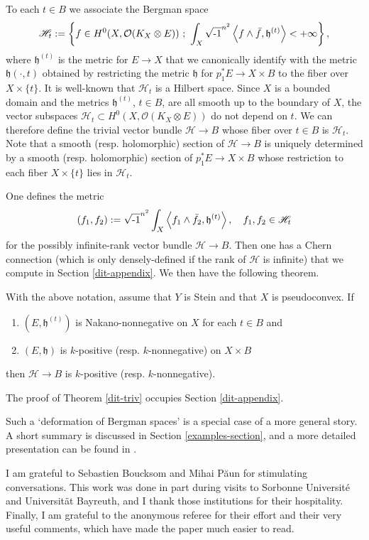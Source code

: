 \documentclass[12pt,hidelinks]{amsart}
\newcommand{\noi}{\noindent}
\newcommand{\cO}{{\mathcal O}}
\newcommand{\sH}{{\mathscr H}}
\newcommand{\fh}{{\mathfrak h}}
\newcommand{\ii}{\sqrt{\text{\rm -}1}}
\newcommand{\tensor}{\otimes}
\begin{document}
To each $t\in B$ we associate the Bergman space 
\[
\sH _t := \left \{ f \in H^0(X, \cO (K_X \tensor E))\ ;\ \int _X \ii ^{n^2}\left< f \wedge \bar f , \fh^{(t)} \right > < +\infty \right \},
\]
where $\fh ^{(t)}$ is the metric for $E \to X$ that we canonically identify with the metric $\fh (\cdot, t)$ obtained by restricting the metric $\fh$ for $p_1^*E \to X \times B$ to the fiber over $X \times \{t\}$.  It is well-known that $\sH_t$ is a Hilbert space.  Since $X$ is a bounded domain and the metrics $\fh^{(t)}$, $t \in B$, are all smooth up to the boundary of $X$, the vector subspaces $\sH _t \subset H^0(X, \cO (K_X \tensor E))$ do not depend on $t$.  We can therefore define the trivial vector bundle $\sH \to B$ whose fiber over $t \in B$ is $\sH _t$.  Note that a smooth (resp. holomorphic) section of $\sH \to B$ is uniquely determined by a smooth (resp. holomorphic) section of $p_1 ^* E \to X\times B$ whose restriction to each fiber $X \times \{t\}$ lies in $\sH _t$.  

One defines the metric
\[
(f_1,f_2) := \ii ^{n^2}\int _X \left < f_1 \wedge \bar f_2, \fh ^{(t)} \right >, \quad f_1,f_2\in \sH_t
\]
for the possibly infinite-rank vector bundle $\sH \to B$.  Then one has a Chern connection (which is only densely-defined if the rank of $\sH$ is infinite) that we compute in Section \ref{dit-appendix}.  We then have the following theorem.

\begin{m-thm}\label{dit-triv}
With the above notation, assume that $Y$ is Stein and that $X$ is pseudoconvex.  If 
\begin{enumerate}[{\rm a.}]
\item $(E, \fh^{(t)})$ is Nakano-nonnegative on $X$ for each $t \in B$ and 
\item $(E, \fh)$ is $k$-positive (resp. $k$-nonnegative) on $X \times B$
\end{enumerate}
then $\sH \to B$ is $k$-positive (resp. $k$-nonnegative).
\end{m-thm}

\noi The proof of Theorem \ref{dit-triv} occupies Section \ref{dit-appendix}.  

Such a `deformation of Bergman spaces' is a special case of a more general story.  A short summary is discussed in Section \ref{examples-section}, and a more detailed presentation can be found in \cite{v-BLS}.

\begin{ack}
I am grateful to Sebastien Boucksom and Mihai P\u{a}un for stimulating conversations.  This work was done in part during visits to Sorbonne Universit\'e and Universit\"at Bayreuth, and I thank those institutions for their hospitality.  Finally, I am grateful to the anonymous referee for their effort and their very useful comments, which have made the paper much easier to read.
\end{ack}
\end{document}
